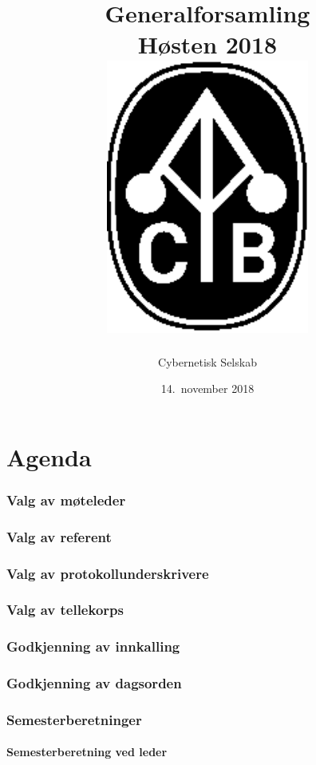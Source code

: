 \documentclass[10pt,norsk,a4paper]{article}
\title{Generalforsamling \\
	Høsten 2018\\[3cm]
	\includegraphics[width=0.5\textwidth]{cyb-logo.eps}\\[-.5cm]}
\date{14.\ november 2018}
\author{Cybernetisk Selskab}
\begin{document}
\maketitle{}
\newpage
\tableofcontents

\part*{Agenda}

\section{Valg av møteleder}

\section{Valg av referent}

\section{Valg av protokollunderskrivere}

\section{Valg av tellekorps}

\section{Godkjenning av innkalling}

\section{Godkjenning av dagsorden}


\section{Semesterberetninger}
\subsection{Semesterberetning ved leder}
\end{document}
